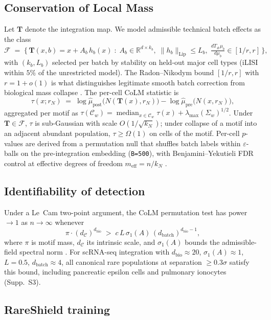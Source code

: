 \subsection*{Conservation of Local Mass}
\label{sec:methods-colm}

Let $\mathbf{T}$ denote the integration map. We model admissible technical batch effects as the class
\[
  \mathcal{F} \;=\; \bigl\{\, \mathbf{T}(x, b) = x + A_b\,h_b(x)\;:\; A_b\in\mathbb{R}^{d\times k_b},\; \|h_b\|_{\text{Lip}}\le L_b,\; \tfrac{dT_\#\mu_b}{d\mu_b}\in[1/r,r] \,\bigr\},
\]
with $(k_b, L_b)$ selected per batch by stability on held-out major cell types (iLISI within $5\%$ of the unrestricted model). The Radon--Nikodym bound $[1/r, r]$ with $r=1+o(1)$ is what distinguishes legitimate smooth batch correction from biological mass collapse \citep{math2026colm}. The per-cell CoLM statistic is
\[
  \tau(x; r_N) \;=\; \log\hat\mu_\text{post}\bigl(N(\mathbf{T}(x), r_N)\bigr) - \log\hat\mu_\text{pre}\bigl(N(x, r_N)\bigr),
\]
aggregated per motif as $\tau(\mathcal{C}_w) = \operatorname{median}_{x\in\mathcal{C}_w} \tau(x) + \lambda_{\max}(\Sigma_w)^{1/2}$. Under $\mathbf{T}\in\mathcal{F}$, $\tau$ is sub-Gaussian with scale $O(1/\sqrt{k_N})$; under collapse of a motif into an adjacent abundant population, $\tau\ge\Omega(1)$ on cells of the motif. Per-cell $p$-values are derived from a permutation null that shuffles batch labels within $\varepsilon$-balls on the pre-integration embedding (\texttt{B=500}), with Benjamini--Yekutieli FDR control at effective degrees of freedom $m_\text{eff} = n / k_N$ \citep{math2026colm}.

\subsection*{Identifiability of detection}
Under a Le~Cam two-point argument, the CoLM permutation test has power $\to 1$ as $n\to\infty$ whenever
\[
  \pi \cdot (d_\mathcal{C})^{d_\text{bio}} \;>\; c\,L\,\sigma_1(A)\,(d_\text{batch})^{d_\text{bio}-1},
\]
where $\pi$ is motif mass, $d_\mathcal{C}$ its intrinsic scale, and $\sigma_1(A)$ bounds the admissible-field spectral norm \citep[\S S1.3]{math2026suppS1}. For scRNA-seq integration with $d_\text{bio}\approx 20$, $\sigma_1(A)\approx 1$, $L=0.5$, $d_\text{batch}\approx 4$, all canonical rare populations at separation $\ge 0.3\sigma$ satisfy this bound, including pancreatic epsilon cells and pulmonary ionocytes (Supp.~S3).

\subsection*{RareShield training}
\label{sec:methods-rareshield}


